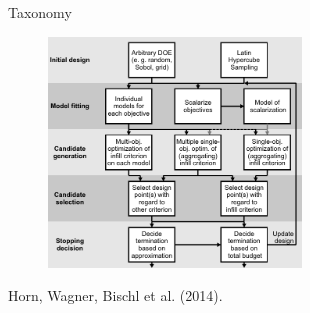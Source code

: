 \documentclass[11pt,compress,t,notes=noshow, xcolor=table]{beamer}
\begin{document}
\begin{frame}{Taxonomy}
\begin{figure}[t]
\centering
\vspace{-0.2cm}
\includegraphics[width = 0.6\textwidth]{figure_man/FlowchartMBMO.pdf}
\end{figure}
  Horn, Wagner, Bischl et al. (2014).
\end{frame}
\end{document}
